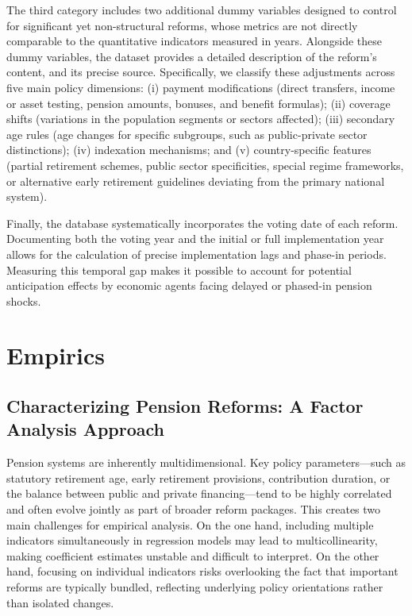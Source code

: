 \documentclass[11pt,english,a4paper, twoside, authoryear]{article}
\begin{document}
The third category includes two additional dummy variables designed to control for significant yet non-structural reforms, whose metrics are not directly comparable to the quantitative indicators measured in years. Alongside these dummy variables, the dataset provides a detailed description of the reform's content, and its precise source. Specifically, we classify these adjustments across five main policy dimensions: (i) payment modifications (direct transfers, income or asset testing, pension amounts, bonuses, and benefit formulas); (ii) coverage shifts (variations in the population segments or sectors affected); (iii) secondary age rules (age changes for specific subgroups, such as public-private sector distinctions); (iv) indexation mechanisms; and (v) country-specific features (partial retirement schemes, public sector specificities, special regime frameworks, or alternative early retirement guidelines deviating from the primary national system).


Finally, the database systematically incorporates the voting date of each reform. Documenting both the voting year and the initial or full implementation year allows for the calculation of precise implementation lags and phase-in periods. Measuring this temporal gap makes it possible to account for potential anticipation effects by economic agents facing delayed or phased-in pension shocks.





\section{Empirics}

\subsection{Characterizing Pension Reforms: A Factor Analysis Approach}
\label{sec:pcfa}

Pension systems are inherently multidimensional. Key policy parameters---such as statutory retirement age, early retirement provisions, contribution duration, or the balance between public and private financing---tend to be highly correlated and often evolve jointly as part of broader reform packages. This creates two main challenges for empirical analysis. On the one hand, including multiple indicators simultaneously in regression models may lead to multicollinearity, making coefficient estimates unstable and difficult to interpret. On the other hand, focusing on individual indicators risks overlooking the fact that important reforms are typically bundled, reflecting underlying policy orientations rather than isolated changes.
\end{document}
